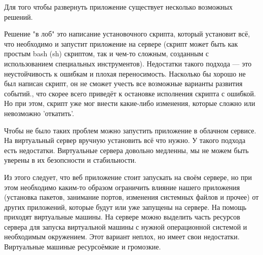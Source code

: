 \documentclass[14pt,a4paper]{scrartcl}
\begin{document}
    Для того чтобы развернуть приложение существует несколько возможных решений.

    Решение "в лоб" это написание установочного скрипта, который установит всё, что необходимо и запустит приложение на сервере (скрипт может быть как простым bash (sh) скриптом, так и чем-то сложным, созданным с использованием специальных инструментов). Недостатки такого подхода — это неустойчивость к ошибкам и плохая переносимость. Насколько бы хорошо не был написан скрипт, он не сможет учесть все возможные варианты развития событий., что скорее всего приведёт к остановке исполнения скрипта с ошибкой. Но при этом, скрипт уже мог внести какие-либо изменения, которые сложно или невозможно 'откатить'.

    Чтобы не было таких проблем можно запустить приложение в облачном сервисе. На виртуальный сервер вручную установить всё что нужно. У такого подхода есть недостатки. Виртуальные сервера довольно медленны, мы не можем быть уверены в их безопсности и стабильности.

    Из этого следует, что веб приложение стоит запускать на своём сервере, но при этом необходимо каким-то образом ограничить влияние нашего приложения (установка пакетов, занимание портов, изменения системных файлов и прочее) от других приложений, которые будут или уже запущены на сервере. На помощь приходят виртуальные машины. На сервере можно выделить часть ресурсов сервера для запуска виртуальной машины с нужной операционной системой и необходимым окружением. Этот вариант неплох, но имеет свои недостатки. Виртуальные машиные ресурсоёмкие и громозкие.
\end{document}
